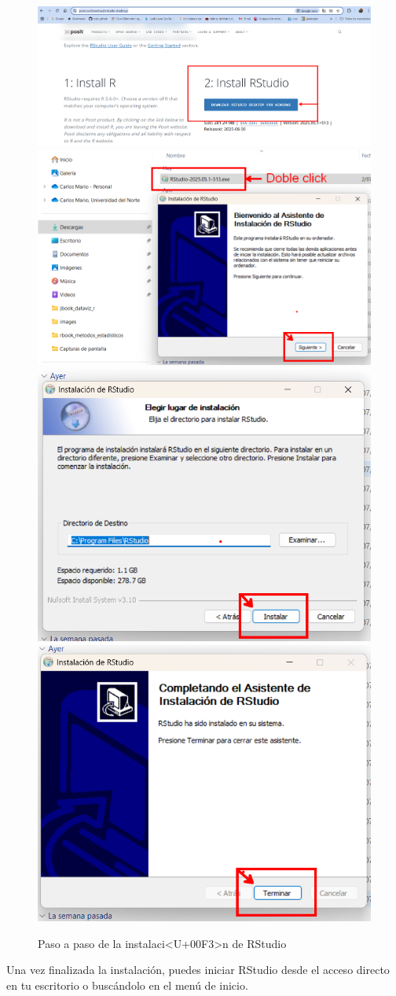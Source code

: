 \documentclass[
]{book}
\begin{document}
\begin{figure}

{\centering \includegraphics[width=0.48\linewidth]{images/rs1} \includegraphics[width=0.48\linewidth]{images/rs2} \includegraphics[width=0.48\linewidth]{images/rs3} \includegraphics[width=0.48\linewidth]{images/rs4} 

}

\caption{Paso a paso de la instalaci<U+00F3>n de RStudio}\label{fig:inst-rs-fig}
\end{figure}

Una vez finalizada la instalación, puedes iniciar RStudio desde el acceso directo en tu escritorio o buscándolo en el menú de inicio.
\end{document}
